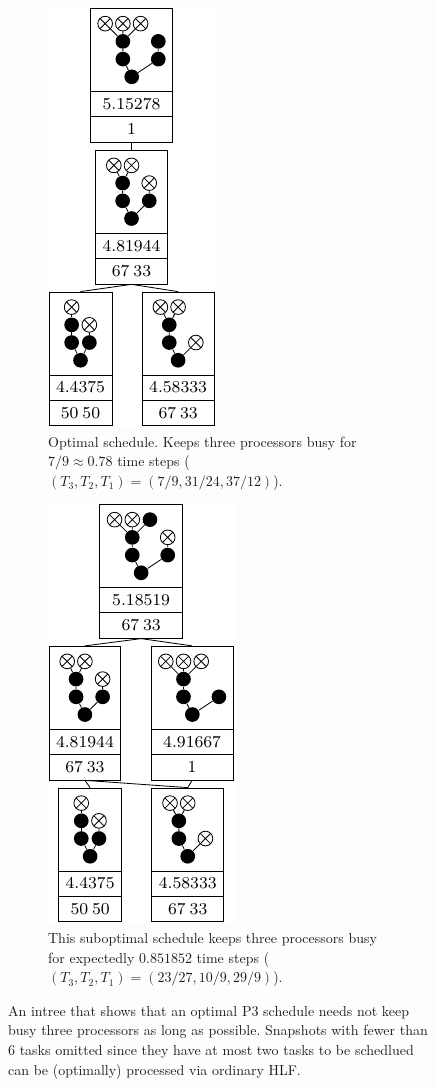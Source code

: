 \begin{figure}[ht]
  \centering
  \begin{subfigure}{.45\linewidth}
    \centering
    \includegraphics{p3/keep_3_busy/three_busy_opt.pdf}
    \caption{Optimal schedule. Keeps three processors busy for $7/9\approx 0.78$ time steps ($(T_3, T_2, T_1)=(7/9, 31/24, 37/12)$).}
  \end{subfigure}
  \quad
  \begin{subfigure}{.45\linewidth}
    \centering
    \includegraphics{p3/keep_3_busy/three_busy_subopt.pdf}
    \caption{This suboptimal schedule keeps three processors busy for expectedly $0.851852$ time steps ($(T_3, T_2, T_1)=(23/27,10/9,29/9)$).}
  \end{subfigure}
  \caption{An intree that shows that an optimal P3 schedule needs not keep busy three processors as long as possible. Snapshots with fewer than 6 tasks omitted since they have at most two tasks to be schedlued can be (optimally) processed via ordinary HLF. }
  \label{fig:p3-p3l-suboptimal-example}
\end{figure}

